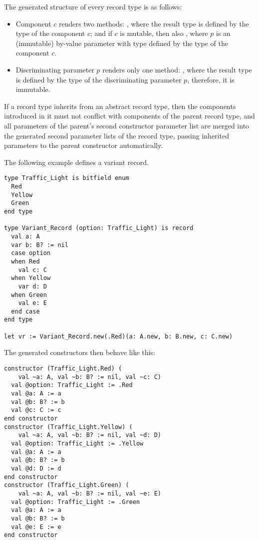 The generated structure of every record type is as follows:
\begin{itemize}
  \item Component $c$ renders two methods: , where the result type is defined by the type of the component $c$; and if $c$ is mutable, then also , where $p$ is an (immutable) by-value parameter with type defined by the type of the component $c$. 
  \item Discriminating parameter $p$ renders only one method: , where the result type is defined by the type of the discriminating parameter $p$, therefore, it is immutable. 
\end{itemize}

If a record type inherits from an abstract record type, then the components introduced in it must not conflict with components of the parent record type, and all parameters of the parent's second constructor parameter list are merged into the generated second parameter lists of the record type, passing inherited parameters to the parent constructor automatically. 

\example The following example defines a variant record. 
\begin{lstlisting}
type Traffic_Light is bitfield enum
  Red
  Yellow
  Green
end type

type Variant_Record (option: Traffic_Light) is record
  val a: A
  var b: B? := nil
  case option
  when Red
    val c: C
  when Yellow
    var d: D
  when Green
    val e: E
  end case
end type

let vr := Variant_Record.new(.Red)(a: A.new, b: B.new, c: C.new)
\end{lstlisting}

The generated constructors then behave like this:
\begin{lstlisting}
constructor (Traffic_Light.Red) (
    val ~a: A, val ~b: B? := nil, val ~c: C)
  val @option: Traffic_Light := .Red
  val @a: A := a
  val @b: B? := b
  val @c: C := c
end constructor
constructor (Traffic_Light.Yellow) (
    val ~a: A, val ~b: B? := nil, val ~d: D)
  val @option: Traffic_Light := .Yellow
  val @a: A := a
  val @b: B? := b
  val @d: D := d
end constructor
constructor (Traffic_Light.Green) (
    val ~a: A, val ~b: B? := nil, val ~e: E)
  val @option: Traffic_Light := .Green
  val @a: A := a
  val @b: B? := b
  val @e: E := e
end constructor
\end{lstlisting}



